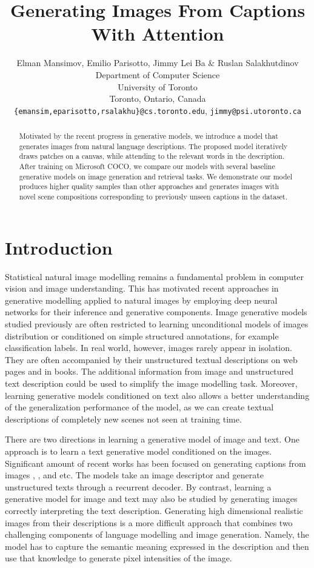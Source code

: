 \documentclass{article} %
\title{Generating Images From Captions\\ With Attention}
\author{
Elman Mansimov, Emilio Parisotto, Jimmy Lei Ba \& Ruslan Salakhutdinov\\
Department of Computer Science\\
University of Toronto\\
Toronto, Ontario, Canada \\
\texttt{\{emansim,eparisotto,rsalakhu\}@cs.toronto.edu}, \texttt{jimmy@psi.utoronto.ca}
}
\begin{document}
\maketitle

\begin{abstract}
Motivated by the recent progress in generative models, we introduce a model that generates images from natural language descriptions. The proposed model iteratively draws patches on a canvas, while attending to the relevant words in the description. After training on Microsoft COCO, we compare our models with several baseline generative models on image generation and retrieval tasks. We demonstrate our model produces higher quality samples than other approaches and generates images with novel scene compositions corresponding to previously unseen captions in the dataset. 
\end{abstract}

\section{Introduction}

Statistical natural image modelling remains a fundamental problem in computer vision and image understanding. This has motivated recent approaches in generative modelling applied to natural images by employing deep neural networks for their inference and generative components. Image generative models studied previously are often restricted to learning unconditional models of images distribution or conditioned on simple structured annotations, for example classification labels. In real world, however, images rarely appear in isolation. They are often accompanied by their unstructured textual descriptions on web pages and in books. The additional information from image and unstructured text description could be used to simplify the image modelling task. Moreover, learning generative models conditioned on text also allows a better understanding of the generalization performance of the model, as we can create textual descriptions of completely new scenes not seen at training time. 

There are two directions in learning a generative model of image and text.  One approach is to learn a text generative model conditioned on the images. Significant amount of recent works has been focused on generating captions from images \citep{karpathy_captions}, \citep{xu_captions}, \citep{kiros_captions} and etc. The models take an image descriptor and generate unstructured texts through a recurrent decoder. By contrast, learning a generative model for image and text may also be studied by generating images correctly interpreting the text description. 
Generating high dimensional realistic images from their descriptions is a more difficult approach that combines two challenging components of language modelling and image generation. Namely, the model has to capture the semantic meaning expressed in the description and then use that knowledge to generate pixel intensities of the image.
\end{document}
